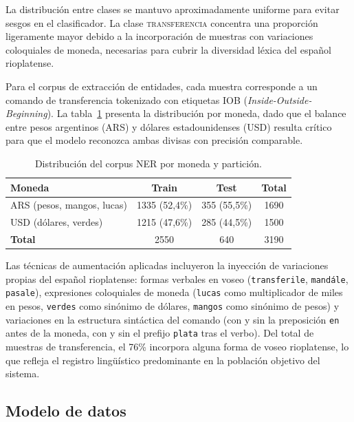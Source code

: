 La distribución entre clases se mantuvo aproximadamente uniforme para evitar sesgos en el clasificador. La clase \textsc{transferencia} concentra una proporción ligeramente mayor debido a la incorporación de muestras con variaciones coloquiales de moneda, necesarias para cubrir la diversidad léxica del español rioplatense.

Para el corpus de extracción de entidades, cada muestra corresponde a un comando de transferencia tokenizado con etiquetas IOB (\textit{Inside-Outside-Beginning}). La tabla~\ref{tab:corpus-ner} presenta la distribución por moneda, dado que el balance entre pesos argentinos (ARS) y dólares estadounidenses (USD) resulta crítico para que el modelo reconozca ambas divisas con precisión comparable.

\begin{table}[H]
\caption{Distribución del corpus NER por moneda y partición.}
\centering
\begin{tabular}{@{}lccc@{}}
\toprule
\textbf{Moneda} & \textbf{Train} & \textbf{Test} & \textbf{Total} \\
\midrule
ARS (pesos, mangos, lucas) & 1335 (52,4\%) & 355 (55,5\%) & 1690 \\
USD (dólares, verdes)      & 1215 (47,6\%) & 285 (44,5\%) & 1500 \\
\midrule
\textbf{Total}             & 2550          & 640          & 3190 \\
\bottomrule
\end{tabular}

\label{tab:corpus-ner}
\end{table}

Las técnicas de aumentación aplicadas incluyeron la inyección de variaciones propias del español rioplatense: formas verbales en voseo (\texttt{transferile}, \texttt{mandále}, \texttt{pasale}), expresiones coloquiales de moneda (\texttt{lucas} como multiplicador de miles en pesos, \texttt{verdes} como sinónimo de dólares, \texttt{mangos} como sinónimo de pesos) y variaciones en la estructura sintáctica del comando (con y sin la preposición \texttt{en} antes de la moneda, con y sin el prefijo \texttt{plata} tras el verbo). Del total de muestras de transferencia, el 76\% incorpora alguna forma de voseo rioplatense, lo que refleja el registro lingüístico predominante en la población objetivo del sistema.

\subsection{Modelo de datos}

